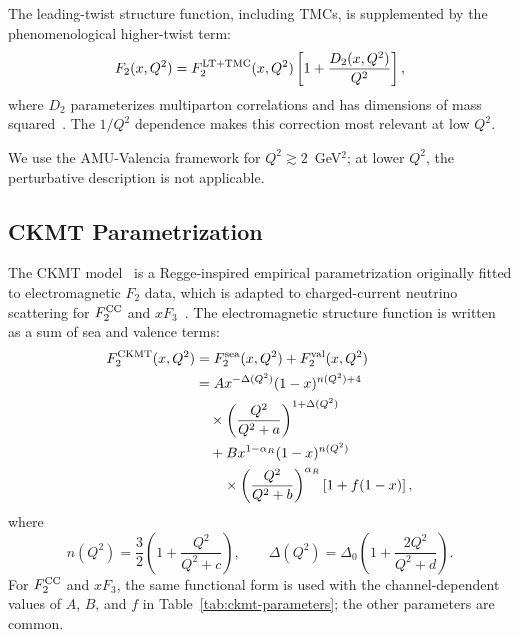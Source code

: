 \documentclass[10pt,twocolumn]{article}
\begin{document}
The leading-twist structure function, including TMCs, is supplemented
by the phenomenological higher-twist term:
\begin{equation}
  F_2(x,Q^2)
    = F_2^{\rm LT+TMC}(x,Q^2)
      \left[1+\frac{D_2(x,Q^2)}{Q^2}\right],
\label{eq:ht}
\end{equation}
where $D_2$ parameterizes multiparton correlations and has dimensions
of mass squared~\cite{Stein1998,Dasgupta1996}. The $1/Q^2$ dependence
makes this correction most relevant at low $Q^2$.

We use the AMU-Valencia framework for $Q^2 \gtrsim 2$~GeV$^2$; at lower $Q^2$,
the perturbative description is not applicable.

\subsection{CKMT Parametrization}

The CKMT model~\cite{CKMT} is a Regge-inspired empirical
parametrization originally fitted to electromagnetic $F_2$ data,
which is adapted to charged-current neutrino scattering for $F_2^{\rm CC}$
and $xF_3$~\cite{RenoCKMT}. The electromagnetic structure function
is written as a sum of sea and valence terms:
\begin{equation}
\begin{aligned}
  F_2^{\rm CKMT}(x,Q^2)
    &= F_2^{\rm sea}(x,Q^2)+F_2^{\rm val}(x,Q^2)\\
    &= A x^{-\Delta(Q^2)}(1-x)^{n(Q^2)+4}\\
    &\quad\times\left(\frac{Q^2}{Q^2+a}\right)^{1+\Delta(Q^2)}\\
    &\quad + B x^{1-\alpha_R}(1-x)^{n(Q^2)}\\
    &\qquad\times\left(\frac{Q^2}{Q^2+b}\right)^{\alpha_R}
       \left[1+f(1-x)\right],
\end{aligned}
\label{eq:ckmt}
\end{equation}
where
\begin{equation}
  n(Q^2)=\frac{3}{2}\left(1+\frac{Q^2}{Q^2+c}\right),
  \qquad
  \Delta(Q^2)=\Delta_0\left(1+\frac{2Q^2}{Q^2+d}\right).
\label{eq:ckmt-exponents}
\end{equation}
For $F_2^{\rm CC}$ and $xF_3$, the same functional form is used with
the channel-dependent values of $A$, $B$, and $f$ in
Table~\ref{tab:ckmt-parameters}; the other parameters are common.
\end{document}
